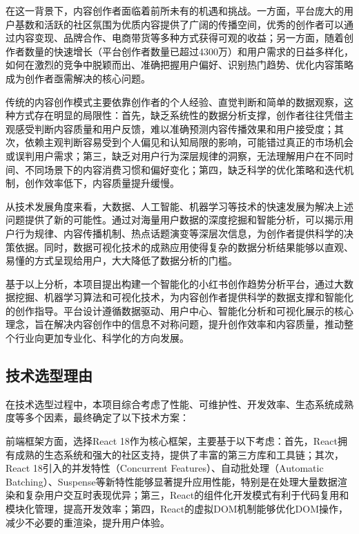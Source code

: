 \documentclass[12pt,a4paper]{article}
\begin{document}
在这一背景下，内容创作者面临着前所未有的机遇和挑战。一方面，平台庞大的用户基数和活跃的社区氛围为优质内容提供了广阔的传播空间，优秀的创作者可以通过内容变现、品牌合作、电商带货等多种方式获得可观的收益；另一方面，随着创作者数量的快速增长（平台创作者数量已超过4300万）和用户需求的日益多样化，如何在激烈的竞争中脱颖而出、准确把握用户偏好、识别热门趋势、优化内容策略成为创作者亟需解决的核心问题。

传统的内容创作模式主要依靠创作者的个人经验、直觉判断和简单的数据观察，这种方式存在明显的局限性：首先，缺乏系统性的数据分析支撑，创作者往往凭借主观感受判断内容质量和用户反馈，难以准确预测内容传播效果和用户接受度；其次，依赖主观判断容易受到个人偏见和认知局限的影响，可能错过真正的市场机会或误判用户需求；第三，缺乏对用户行为深层规律的洞察，无法理解用户在不同时间、不同场景下的内容消费习惯和偏好变化；第四，缺乏科学的优化策略和迭代机制，创作效率低下，内容质量提升缓慢。

从技术发展角度来看，大数据、人工智能、机器学习等技术的快速发展为解决上述问题提供了新的可能性\cite{big-data-analytics,machine-learning-social}。通过对海量用户数据的深度挖掘和智能分析，可以揭示用户行为规律、内容传播机制、热点话题演变等深层次信息，为创作者提供科学的决策依据\cite{social-media-analytics}。同时，数据可视化技术的成熟应用使得复杂的数据分析结果能够以直观、易懂的方式呈现给用户，大大降低了数据分析的门槛\cite{data-visualization}。

基于以上分析，本项目提出构建一个智能化的小红书创作趋势分析平台，通过大数据挖掘、机器学习算法和可视化技术，为内容创作者提供科学的数据支撑和智能化的创作指导。平台设计遵循数据驱动、用户中心、智能化分析和可视化展示的核心理念，旨在解决内容创作中的信息不对称问题，提升创作效率和内容质量，推动整个行业向更加专业化、科学化的方向发展。

\subsection{技术选型理由}

在技术选型过程中，本项目综合考虑了性能、可维护性、开发效率、生态系统成熟度等多个因素，最终确定了以下技术方案：

前端框架方面，选择React 18作为核心框架，主要基于以下考虑：首先，React拥有成熟的生态系统和强大的社区支持，提供了丰富的第三方库和工具链；其次，React 18引入的并发特性（Concurrent Features）、自动批处理（Automatic Batching）、Suspense等新特性能够显著提升应用性能，特别是在处理大量数据渲染和复杂用户交互时表现优异\cite{react-hooks}；第三，React的组件化开发模式有利于代码复用和模块化管理，提高开发效率；第四，React的虚拟DOM机制能够优化DOM操作，减少不必要的重渲染，提升用户体验。
\end{document}
